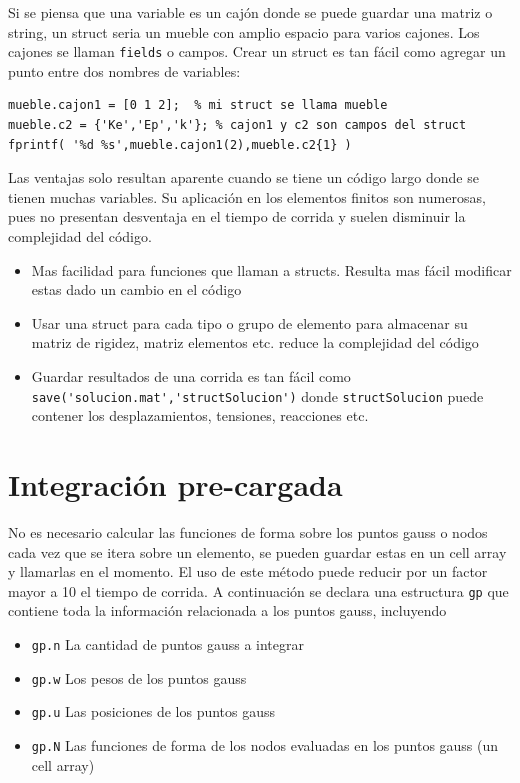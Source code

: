 Si se piensa que una variable es un cajón donde se puede guardar una matriz o string, un struct seria un mueble con amplio espacio para varios cajones. Los cajones se llaman \verb|fields| o campos. Crear un struct es tan fácil como agregar un punto entre dos nombres de variables:

\begin{lstlisting}[caption={Ejemplos de structs y como acceder a sus campos.}]
mueble.cajon1 = [0 1 2];  % mi struct se llama mueble
mueble.c2 = {'Ke','Ep','k'}; % cajon1 y c2 son campos del struct 
fprintf( '%d %s',mueble.cajon1(2),mueble.c2{1} )
\end{lstlisting}

Las ventajas solo resultan aparente cuando se tiene un código largo donde se tienen muchas variables. Su aplicación en los elementos finitos son numerosas, pues no presentan desventaja en el tiempo de corrida y suelen disminuir la complejidad del código.

\begin{itemize}
	\item Mas facilidad para funciones que llaman a structs. Resulta mas fácil modificar estas dado un cambio en el código
	\item Usar una struct para cada tipo o grupo de elemento para almacenar su matriz de rigidez, matriz elementos etc. reduce la complejidad del código
	\item Guardar resultados de una corrida es tan fácil como \verb|save('solucion.mat','structSolucion')| donde \verb|structSolucion| puede contener los desplazamientos, tensiones, reacciones etc.
\end{itemize}



\section{Integración pre-cargada}
No es necesario calcular las funciones de forma sobre los puntos gauss o nodos cada vez que se itera sobre un elemento, se pueden guardar estas en un cell array y llamarlas en el momento. El uso de este método puede reducir por un factor mayor a 10 el tiempo de corrida. A continuación se declara una estructura \verb|gp| que contiene toda la información relacionada a los puntos gauss, incluyendo

\begin{itemize}
	\item \verb|gp.n| La cantidad de puntos gauss a integrar
	\item \verb|gp.w| Los pesos de los puntos gauss
	\item \verb|gp.u| Las posiciones de los puntos gauss
	\item \verb|gp.N| Las funciones de forma de los nodos evaluadas en los puntos gauss (un cell array)
\end{itemize}

